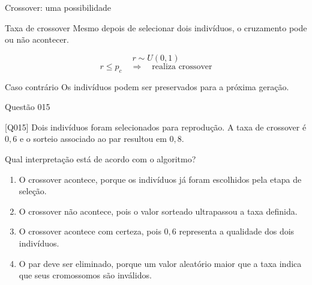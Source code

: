 \documentclass[xcolor=dvipsnames,table]{beamer}
\begin{document}
\begin{frame}{Crossover: uma possibilidade}

    \begin{block}{Taxa de crossover}
        Mesmo depois de selecionar dois indivíduos, o cruzamento
        pode ou não acontecer.
    \end{block}

    \begin{center}
        \Large
        \[
        r \sim U(0,1)
        \]
        \[
        r \leq p_c
        \quad\Longrightarrow\quad
        \text{realiza crossover}
        \]
    \end{center}

    \begin{block}{Caso contrário}
        Os indivíduos podem ser preservados para a próxima geração.
    \end{block}

\end{frame}

\begin{frame}{Questão 015}

    \begin{block}{[Q015]}
        Dois indivíduos foram selecionados para reprodução.
        A taxa de crossover é $0{,}6$ e o sorteio associado
        ao par resultou em $0{,}8$.

        Qual interpretação está de acordo com o algoritmo?
    \end{block}

    \begin{enumerate}[label=(\Alph*)]

        \item O crossover acontece, porque os indivíduos já foram
        escolhidos pela etapa de seleção.

        \item O crossover não acontece, pois o valor sorteado
        ultrapassou a taxa definida.

        \item O crossover acontece com certeza, pois $0{,}6$
        representa a qualidade dos dois indivíduos.

        \item O par deve ser eliminado, porque um valor aleatório
        maior que a taxa indica que seus cromossomos são inválidos.

    \end{enumerate}

\end{frame}
\end{document}
